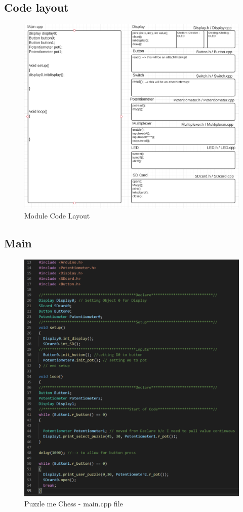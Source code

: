\documentclass[11pt]{article}
\begin{document}
\subsection{Code layout}

\begin{figure}
  \includegraphics[width=\linewidth]{./Pics/code_layout.PNG}
  \caption{Module Code Layout}
  \label{fig:MCL1}
\end{figure}

\subsection{Main}

\begin{figure}
  \includegraphics[width=\linewidth]{./Pics/maincpp.PNG}
  \caption{Puzzle me Chess - main.cpp file}
  \label{fig:main}
\end{figure}
\end{document}
